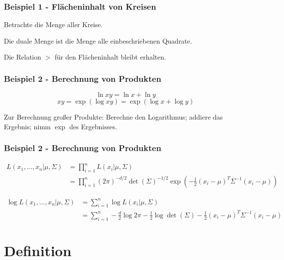 \documentclass{beamer}
\begin{document}
\begin{frame}
\frametitle{Beispiel 1 - Flächeninhalt von Kreisen}
Betrachte die Menge aller Kreise.

Die duale Menge ist die Menge alle einbeschriebenen Quadrate.
\hfill \newline
{}
\hfill \newline
Die Relation $>$ für den Flächeninhalt bleibt erhalten.
\end{frame}

\begin{frame}
\frametitle{Beispiel 2 - Berechnung von Produkten}

$$\ln xy = \ln x + \ln y $$
$$xy = \exp(\log xy) = \exp(\log x + \log y)$$

Zur Berechnung großer Produkte:
Berechne den Logarithmus; addiere das Ergebnis; nimm $\exp$ des Ergebnisses.

\end{frame}

\begin{frame}
\frametitle{Beispiel 2 - Berechnung von Produkten}
{\footnotesize
\begin{align*}
L(x_1, \dots, x_n|\mu, \Sigma) &= \prod_{i = 1}^{n} L(x_i|\mu, \Sigma)\\
&= \prod_{i = 1}^{n} (2 \pi)^{-d/2} \det(\Sigma)^{-1/2} \exp(- \frac{1}{2} (x_i - \mu)^T \Sigma^{-1} (x_i - \mu))
\end{align*}

\begin{align*}
\log L(x_1, \dots, x_n|\mu, \Sigma) &= \sum_{i = 1}^{n} \log L(x_i|\mu, \Sigma)\\
&= \sum_{i = 1}^{n} -\frac{d}{2} \log 2\pi -\frac{1}{2} \log \det(\Sigma) - \frac{1}{2} (x_i - \mu)^T \Sigma^{-1} (x_i - \mu)
\end{align*}

}%


\end{frame}

\section{Definition}
\end{document}
